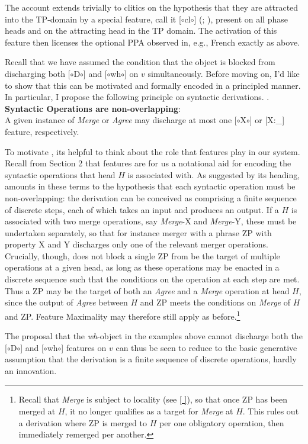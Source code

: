 \documentclass[11pt, letterpaper]{paper_nick}
\newcommand{\fm}[1]{[$\circ$#1$\circ$]}
\begin{document}
The account extends trivially to clitics on the hypothesis that they are attracted into the TP-domain by a special feature, call it \fm{cl} (\citealt{sportiche96}; \citealt{wurmbrand16}), present on all phase heads and on the attracting head in the TP domain. The activation of this feature then licenses the optional PPA observed in, e.g., French exactly as above.  

Recall that we have assumed the condition that the object is blocked from discharging both \fm{D} and \fm{wh} on $v$ simultaneously. Before moving on, I'd like to show that this can be motivated and formally encoded in a principled manner. In particular, I propose the following principle on syntactic derivations. 
\ex. \textbf{Syntactic Operations are non-overlapping}:\\
A given instance of \emph{Merge} or \emph{Agree} may discharge at most one \fm{X} or [X:\_] feature, respectively. 

To motivate \Last, its helpful to think about the role that features play in our system. Recall from Section 2 that features are for us a notational aid for encoding the syntactic operations that head $H$ is associated with. As suggested by its heading, \Last amounts in these terms to the hypothesis that each syntactic operation must be non-overlapping: the derivation can be conceived as comprising a finite sequence of discrete steps, each of which takes an input and produces an output. If a $H$ is associated with two merge operations, say \emph{Merge}-X  and \emph{Merge}-Y, these must be undertaken separately, so that for instance merger with a phrase ZP with property X and Y discharges only one of the relevant merger operations. Crucially, though, \Last does not block a single ZP from be the target of multiple operations at a given head, as long as these operations may be enacted in a discrete sequence such that the conditions on the operation at each step are met. Thus a ZP may be the target of both an \emph{Agree} and a \emph{Merge} operation at head $H$, since the output of \emph{Agree} between $H$ and ZP meets the conditions on \emph{Merge} of $H$ and ZP. Feature Maximality may therefore still apply as before.\footnote{Recall that \emph{Merge} is subject to locality (see \ref{ }), so that once ZP has been merged at $H$, it no longer qualifies as a target for \emph{Merge} at $H$. This rules out a derivation where ZP is merged to $H$ per one obligatory operation, then immediately remerged per another.}

The proposal that the \emph{wh}-object in the examples above cannot discharge both the \fm{D} and \fm{wh} features on $v$ can thus be seen to reduce to the basic generative assumption that the derivation is a finite sequence of discrete operations, hardly an innovation. 
\end{document}

